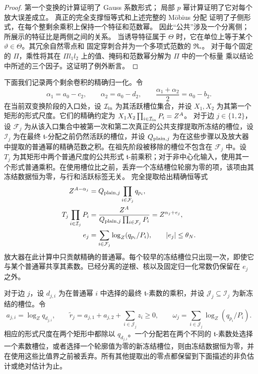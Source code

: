 \documentclass[11pt,a4paper]{article}
\numberwithin{equation}{section}
\numberwithin{figure}{section}
\theoremstyle{definition}
\theoremstyle{remark}
\begin{document}
\begin{proof}
第一个变换的计算证明了 Gauss 系数形式；
局部 \(p\) 幂计算证明了它对每个放大误差成立。
真正的完全支撑恒等式和上述完整的 M\"obius 分配
证明了子侧形式，在每个整剩余乘积上保持一个特征和范数幂。
因此“公共”涉及一个分离侧；
所展示的特征比是两侧之间的关系。
当诱导特征属于 \(\Theta\) 时，它在单位上等于某个
\(\vartheta\in\Theta\)。其冗余自然零点和
固定穿刺合并为一个多项式范数的 \(\mathfrak R_*\)。
对于每个固定的 \(\Pi\)，乘性将其在 \(\Pi l_1l_2\) 上的值、掩码和范数幂分解为 \(\Pi\) 中的一个标量
乘以结论中所述的三个因子。这证明了例外断言。
\end{proof}下面我们记录两个剩余卷积的精确归一化。令
\[
 \alpha_1=a_0-c_2,\qquad \alpha_2=a_0-d_2,\qquad
 \frac{\alpha_1+\alpha_2}{2}=a_0-b_2.
\]
在当前双变换阶段的入口处，设
\(\mathcal I_{\rm in}\) 为其活跃槽位集合，并设 \(X_1,X_2\)
为其第一个矩形的形式尺度。它们的精确约定为
\(X_1X_2\prod_{i\in\mathcal I_{\rm in}}P_i=Z^A\)。
对于边 \(j\in\{1,2\}\)，设 \(\mathcal F_j\) 为从该入口集合中被第一次和第二次真正的公共支撑提取所冻结的槽位，设 \(\mathcal I_j\) 为在最终 \(\mathfrak t\)-分配之前仍然活跃的槽位，并设 \(Q_{{\rm plain},j}\) 为在这些步骤以及放大器中提取的普通幂的精确范数之积。在祖先阶段被移除的槽位不包含在 \(\mathcal F_j\) 中。设 \(T_j\) 为其矩形中两个普通尺度的公共形式 \(\mathfrak t\)-前乘积；对于非中心化输入，使用其一个形式普通乘积。在使用槽位比之前，丢弃一个冻结槽位轮廓为零的项，该项由其冻结数据恒为零，与行和活跃标签无关。
完全提取给出精确恒等式
\[
 \begin{aligned}
 Z^{A-\alpha_j}
   &=Q_{{\rm plain},j}\prod_{i\in\mathcal F_j}q_{p_i},\\
 T_j\prod_{i\in\mathcal I_j}P_i
   &=\frac{Z^A}{Q_{{\rm plain},j}\prod_{i\in\mathcal F_j}P_i}
     =Z^{\alpha_j+e_j},\\
 e_j&=\sum_{i\in\mathcal F_j}\log_Z(q_{p_i}/P_i),
 \qquad |e_j|\le\theta_N.
 \end{aligned}
\]
放大器在此计算中只贡献精确的普通幂。每个较早的冻结槽位只出现一次，即使它与某个普通幂共享其素数。已经分离的逆根、核以及固定归一化常数仍保留在 \(e_j\) 之外。

对于边 \(j\)，设 \(d_{j,i}\) 为在普通幂 \(i\) 中选择的最终 \(\mathfrak t\)-素数的乘积，并设 \(\mathcal J_j\subseteq\mathcal I_j\) 为新冻结的槽位。令
\[
 a_{j,i}=\log_Zq_{d_{j,i}},\qquad
 \widetilde r_j=a_{j,1}+a_{j,2}+\sum_{i\in\mathcal J_j}z_i\ge0,
 \qquad
 \omega_j=\sum_{i\in\mathcal J_j}\log_Z(q_{p_i}/P_i).
\]
相应的形式尺度在两个矩形中都除以 \(q_{d_{j,i}}\)。一个分配若在两个不同的 \(\mathfrak t\)-素数处选择一个素数槽位，或者选择一个轮廓值为零的新冻结槽位，则由冻结数据恒为零，并在使用这些比值界之前被丢弃。所有其他提取出的零点都保留到下面描述的非负估计或绝对估计为止。
\end{document}
